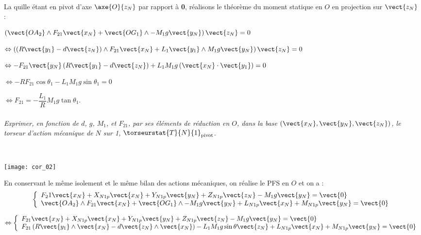 \begin{multicols}{2}
\begin{corrige}
La quille étant en pivot d'axe $\axe{O}{z_N}$ par rapport à \textbf{0}, réalisons le théorème du moment statique en $O$ en projection sur $\vect{z_N}$ :

\noindent
$\left(\vect{OA_2}\wedge F_{21}\vect{x_N}  + 
\vect{OG_1}\wedge -M_1g\vect{y_N} \right) \vect{z_N} = {0}$ 

\noindent
$\Leftrightarrow  \left(\left( R\vect{y_1} - d\vect{z_N}\right)\wedge F_{21}\vect{x_N}  
+L_1\vect{y_1}\wedge M_1g\vect{y_N} \right) \vect{z_N} = {0}$

\noindent
$\Leftrightarrow 
-F_{21}\vect{y_N}\left( R\vect{y_1} - d\vect{z_N}\right)  
+L_1 M_1g\left(\vect{x_N} \cdot \vect{y_1}\right) = {0}$
\noindent

\noindent
$\Leftrightarrow 
-RF_{21}\cos \theta_1
-L_1 M_1g\sin\theta_1 = {0}$

\noindent
$\Leftrightarrow F_{21}=-\dfrac{L_1}{R} M_1g\tan\theta_1 $.

\end{corrige}
\else
\fi

\subparagraph{}\textit{Exprimer, en fonction de $d$, $g$,
$M_1$, et $F_{21}$, par ses éléments de réduction en $O$, dans la base $\left( \vect{x_N} , \vect{y_N} , \vect{z_N} \right)$, le torseur d’action mécanique de $N$
sur 1, $\torseurstat{T}{N}{1}_{\text{pivot}}$.}
\ifprof
\begin{corrige} ~\\

\begin{center}
\texttt{[image: cor\_02]}
\end{center}


En conservant le même isolement et le même bilan des actions mécaniques, on réalise le PFS en $O$ et on a : 
$$
\left\{
\begin{array}{l}
F_21\vect{x_N}+X_{N1p}\vect{x_N}+Y_{N1p}\vect{y_N}+Z_{N1p}\vect{z_N} - M_1g\vect{y_N} = \vect{0}\\
\vect{OA_2}\wedge F_{21}\vect{x_N}  + 
\vect{OG_1}\wedge -M_1g\vect{y_N}  +L_{N1p}\vect{x_N}+M_{N1p}\vect{y_N}= \vect{0} \\
\end{array}
\right.
$$



$$ \Leftrightarrow
\left\{
\begin{array}{l}
F_{21}\vect{x_N}+X_{N1p}\vect{x_N}+Y_{N1p}\vect{y_N}+Z_{N1p}\vect{z_N} - M_1g\vect{y_N} = \vect{0}\\
 F_{21}\left( R\vect{y_1} \wedge \vect{x_N}- d\vect{z_N}\wedge \vect{x_N}\right)  
-L_1M_1g \sin \theta \vect{z_N} +L_{N1p}\vect{x_N}+M_{N1p}\vect{y_N} = \vect{0} \\
\end{array}
\right.
$$


\end{corrige}
\end{multicols}

